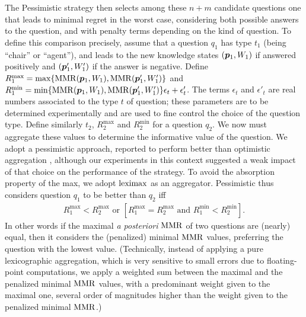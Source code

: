 \documentclass[sigconf, anonymous]{aamas}
\begin{document}
The Pessimistic strategy then selects among these $n + m$ candidate questions one that leads to minimal regret in the worst case, considering both possible answers to the question, and with penalty terms depending on the kind of question. To define this comparison precisely, assume that a question $q_1$ has type $t_1$ (being “chair” or “agent”), and leads to the new knowledge states $({\bm{p}}_1, W_1)$ if answered positively and $({\bm{p}}'_1, W'_1)$ if the answer is negative. 
Define $R^{\max}_1 = \max\{\operatorname{MMR}({\bm{p}}_1, W_1), \operatorname{MMR}({\bm{p}}'_1, W'_1)\}$
and $R^{\min}_1 = \min\{\operatorname{MMR}({\bm{p}}_1, W_1), \operatorname{MMR}({\bm{p}}'_1, W'_1)\} \epsilon_{t} + \epsilon'_{t}$.
The terms $\epsilon_t$ and $\epsilon'_{t}$ are real numbers associated to the type $t$ of question; these parameters are to be determined experimentally and are used to fine control the choice of the question type.
Define similarly $t_2$, $R^{\max}_2$ and $R^{\min}_2$ for a question $q_2$.
We now must aggregate these values to determine the informative value of the question. We adopt a pessimistic approach, reported to perform better than optimistic aggregation \citep{Cailloux2014}, although our experiments in this context suggested a weak impact of that choice on the performance of the strategy.
To avoid the absorption property of the max, we adopt $\operatorname{leximax}$ as an aggregator.
Pessimistic thus considers question $q_1$ to be better  than $q_2$ iff
\begin{align}
	R^{\max}_1 < R^{\max}_2 \text{ or } [R^{\max}_1 = R^{\max}_2 \text{ and } R^{\min}_1 < R^{\min}_2].
\end{align}
In other words if the maximal {\em a posteriori} $\operatorname{MMR}$ of two questions are (nearly) equal, then it considers the (penalized) minimal $\operatorname{MMR}$ values, preferring the question with the lowest value.
(Technically, instead of applying a pure lexicographic aggregation, which is very sensitive to small errors due to floating-point computations, we apply a weighted sum between the maximal and the penalized minimal $\operatorname{MMR}$ values, with a predominant weight given to the maximal one, several order of magnitudes higher than the weight given to the penalized minimal $\operatorname{MMR}$.)
\end{document}
